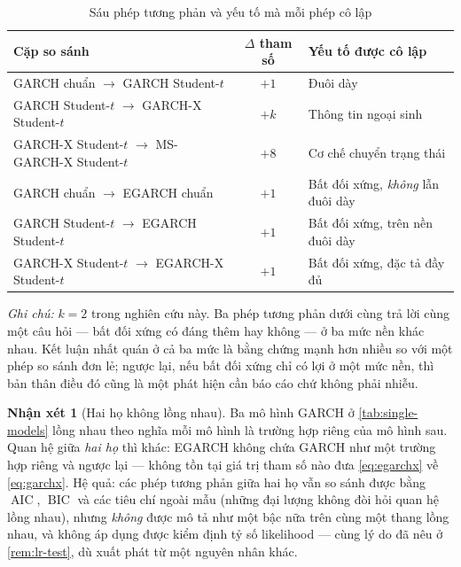 \documentclass[12pt,a4paper]{article}
\numberwithin{equation}{section}
\theoremstyle{definition}
\newtheorem{remark}{Nhận xét}[section]
\newcommand{\AIC}{\operatorname{AIC}}
\newcommand{\BIC}{\operatorname{BIC}}
\begin{document}
	\begin{table}[H]
		\centering\footnotesize
		\setlength{\tabcolsep}{4pt}
		\caption{Sáu phép tương phản và yếu tố mà mỗi phép cô lập}
		\label{tab:contrasts}
		\begin{tabularx}{\textwidth}{Y c Y}
			\toprule
			\textbf{Cặp so sánh} & \textbf{$\Delta$ tham số} & \textbf{Yếu tố được cô lập} \\
			\midrule
			GARCH chuẩn $\to$ GARCH Student-$t$ & $+1$ & Đuôi dày \\
			\addlinespace[0.2em]
			GARCH Student-$t$ $\to$ GARCH-X Student-$t$ & $+k$ & Thông tin ngoại sinh \\
			\addlinespace[0.2em]
			GARCH-X Student-$t$ $\to$ MS-GARCH-X Student-$t$ & $+8$ & Cơ chế chuyển trạng thái \\
			\midrule
			GARCH chuẩn $\to$ EGARCH chuẩn & $+1$ & Bất đối xứng, \emph{không} lẫn đuôi dày \\
			\addlinespace[0.2em]
			GARCH Student-$t$ $\to$ EGARCH Student-$t$ & $+1$ & Bất đối xứng, trên nền đuôi dày \\
			\addlinespace[0.2em]
			GARCH-X Student-$t$ $\to$ EGARCH-X Student-$t$ & $+1$ & Bất đối xứng, đặc tả đầy đủ \\
			\bottomrule
		\end{tabularx}
		\vspace{0.3em}
		\raggedright\scriptsize
		\emph{Ghi chú:} $k=2$ trong nghiên cứu này. Ba phép tương phản dưới cùng trả lời cùng
		một câu hỏi --- bất đối xứng có đáng thêm hay không --- ở ba mức nền khác nhau. Kết
		luận nhất quán ở cả ba mức là bằng chứng mạnh hơn nhiều so với một phép so sánh đơn lẻ;
		ngược lại, nếu bất đối xứng chỉ có lợi ở một mức nền, thì bản thân điều đó cũng là một
		phát hiện cần báo cáo chứ không phải nhiễu.
	\end{table}

	\begin{remark}[Hai họ không lồng nhau]\label{rem:non-nested}
		Ba mô hình GARCH ở \cref{tab:single-models} lồng nhau theo nghĩa mỗi mô hình là trường
		hợp riêng của mô hình sau. Quan hệ giữa \emph{hai họ} thì khác: EGARCH không chứa GARCH
		như một trường hợp riêng và ngược lại --- không tồn tại giá trị tham số nào đưa
		\eqref{eq:egarchx} về \eqref{eq:garchx}. Hệ quả: các phép tương phản giữa hai họ vẫn so
		sánh được bằng $\AIC$, $\BIC$ và các tiêu chí ngoài mẫu (những đại lượng không đòi hỏi
		quan hệ lồng nhau), nhưng \emph{không} được mô tả như một bậc nữa trên cùng một thang
		lồng nhau, và không áp dụng được kiểm định tỷ số likelihood --- cùng lý do đã nêu ở
		\cref{rem:lr-test}, dù xuất phát từ một nguyên nhân khác.
	\end{remark}
\end{document}
